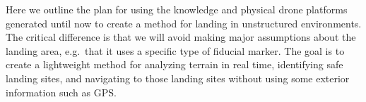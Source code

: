 Here we outline the plan for using the knowledge and physical drone platforms generated
until now to create a method for landing in unstructured environments.
The critical difference is that we will avoid making major assumptions about the landing area,
e.g.~that it uses a specific type of fiducial marker.
The goal is to create a lightweight method for analyzing terrain in real time,
identifying safe landing sites,
and navigating to those landing sites without using some exterior information such as GPS.